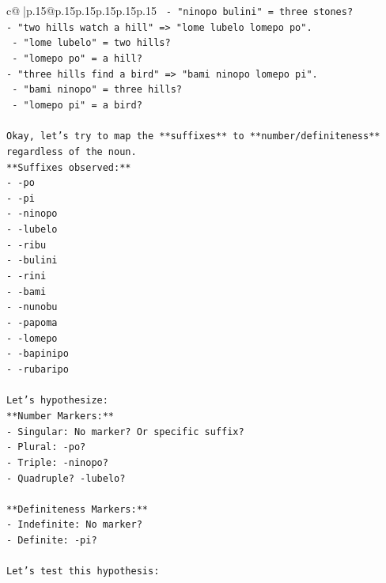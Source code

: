 \documentclass{article}
\begin{document}
{\begin{supertabular}{c@{$\;$}|p{.15\linewidth}@{}p{.15\linewidth}p{.15\linewidth}p{.15\linewidth}p{.15\linewidth}p{.15\linewidth}}
{{{\texttt{  {-} "ninopo bulini" = three stones?} \\
\texttt{{-} "two hills watch a hill" => "lome lubelo lomepo po".} \\
\texttt{  {-} "lome lubelo" = two hills?} \\
\texttt{  {-} "lomepo po" = a hill?} \\
\texttt{{-} "three hills find a bird" => "bami ninopo lomepo pi".} \\
\texttt{  {-} "bami ninopo" = three hills?} \\
\texttt{  {-} "lomepo pi" = a bird?} \\
\\ 
\texttt{Okay, let's try to map the **suffixes** to **number/definiteness** regardless of the noun.} \\
\texttt{**Suffixes observed:**} \\
\texttt{{-} {-}po} \\
\texttt{{-} {-}pi} \\
\texttt{{-} {-}ninopo} \\
\texttt{{-} {-}lubelo} \\
\texttt{{-} {-}ribu} \\
\texttt{{-} {-}bulini} \\
\texttt{{-} {-}rini} \\
\texttt{{-} {-}bami} \\
\texttt{{-} {-}nunobu} \\
\texttt{{-} {-}papoma} \\
\texttt{{-} {-}lomepo} \\
\texttt{{-} {-}bapinipo} \\
\texttt{{-} {-}rubaripo} \\
\\ 
\texttt{Let's hypothesize:} \\
\texttt{**Number Markers:**} \\
\texttt{{-} Singular: No marker? Or specific suffix?} \\
\texttt{{-} Plural: {-}po?} \\
\texttt{{-} Triple: {-}ninopo?} \\
\texttt{{-} Quadruple? {-}lubelo?} \\
\\ 
\texttt{**Definiteness Markers:**} \\
\texttt{{-} Indefinite: No marker?} \\
\texttt{{-} Definite: {-}pi?} \\
\\ 
\texttt{Let's test this hypothesis:} \\
}}}
\end{supertabular}}
\end{document}
